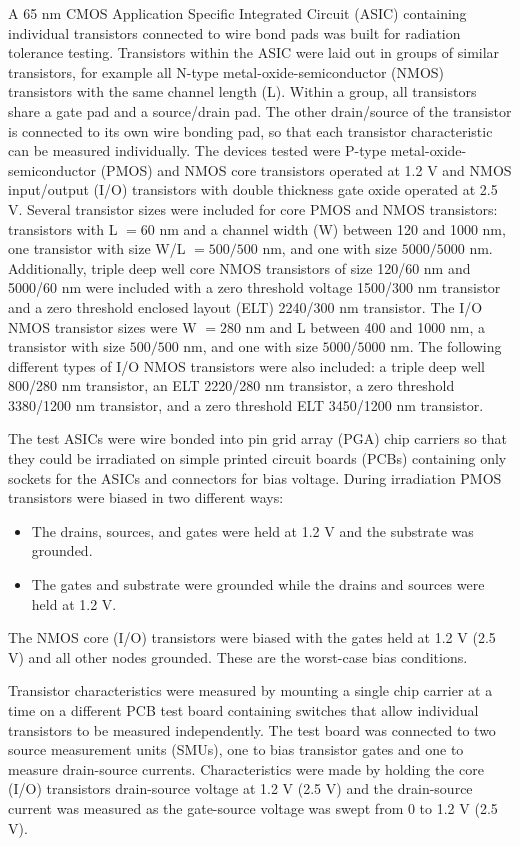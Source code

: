 A 65 nm CMOS Application Specific Integrated Circuit (ASIC) containing individual transistors connected to wire bond pads was built for radiation tolerance testing. Transistors within the ASIC were laid out in groups of similar transistors, for example all N-type metal-oxide-semiconductor (NMOS) transistors with the same channel length (L). Within a group, all transistors share a gate pad and a source/drain pad. The other drain/source of the transistor is connected to its own wire bonding pad, so that each transistor characteristic can be measured individually. The devices tested were P-type metal-oxide-semiconductor (PMOS) and NMOS core transistors operated at 1.2 V and NMOS input/output (I/O) transistors with double thickness gate oxide operated at 2.5 V. Several transistor sizes were included for core PMOS and NMOS transistors: transistors with L $=60$ nm and a channel width (W) between 120 and 1000 nm, one transistor with size W/L $=500/500$ nm, and one with size $5000/5000$ nm. Additionally, triple deep well core NMOS transistors of size 120/60 nm and 5000/60 nm were included with a zero threshold voltage 1500/300 nm transistor and a zero threshold enclosed layout (ELT) 2240/300 nm transistor. The I/O NMOS transistor sizes were W $=280$ nm and L between 400 and 1000 nm, a transistor with size $500/500$ nm, and one with size $5000/5000$ nm. The following different types of I/O NMOS transistors were also included: a triple deep well 800/280 nm transistor, an ELT 2220/280 nm transistor, a zero threshold 3380/1200 nm transistor, and a zero threshold ELT 3450/1200 nm transistor.

The test ASICs were wire bonded into pin grid array (PGA) chip carriers so that they could be irradiated on simple printed circuit boards (PCBs) containing only sockets for the ASICs and connectors for bias voltage. During irradiation PMOS transistors were biased in two different ways: 

\begin{itemize}
\item The drains, sources, and gates were held at 1.2 V and the substrate was grounded. 
\item The gates and substrate were grounded while the drains and sources were held at 1.2 V. 
\end{itemize}
The NMOS core (I/O) transistors were biased with the gates held at 1.2 V (2.5 V) and all other nodes grounded. These are the worst-case bias conditions.

Transistor characteristics were measured by mounting a single chip carrier at a time on a different PCB test board containing switches that allow individual transistors to be measured independently. The test board was connected to two source measurement units (SMUs), one to bias transistor gates and one to measure drain-source currents. Characteristics were made by holding the core (I/O) transistors drain-source voltage at 1.2 V (2.5 V) and the drain-source current was measured as the gate-source voltage was swept from 0 to 1.2 V (2.5 V). 

